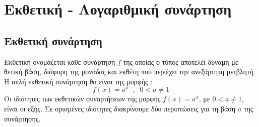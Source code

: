 \chapter{Εκθετική - Λογαριθμική συνάρτηση}
\section{Εκθετική συνάρτηση}
\orismoi
{}
Εκθετική ονομάζεται κάθε συνάρτηση $ f $ της οποίας ο τύπος αποτελεί δύναμη με θετική βάση, διάφορη της μονάδας και εκθέτη που περιέχει την ανεξάρτητη μετβλητή. Η απλή εκθετική συνάρτηση θα είναι της μορφής :
\[ f(x)=a^x\;\;,\;\;0<a\neq1 \]
\thewrhmata
{}
Οι ιδιότητες των εκθετικών συναρτήσεων της μορφής $ f(x)=a^x $, με $ 0<a\neq1 $, είναι οι εξής. Σε ορισμένες ιδιότητες διακρίνουμε δύο περιπτώσεις για τη βάση $ a $ της συνάρτησης.
